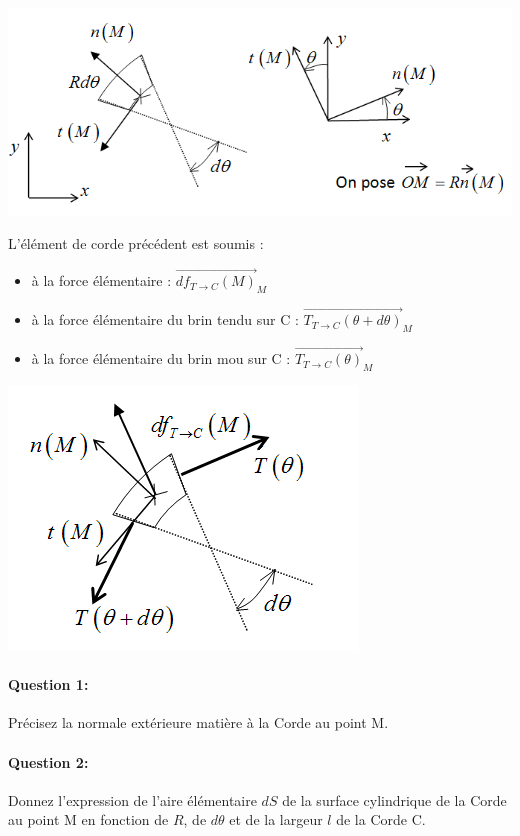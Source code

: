 \begin{center}
	\includegraphics[width=0.7\linewidth]{img/winch_param.png}
\end{center}

 \begin{minipage}{0.45\linewidth}
L'élément de corde précédent est soumis :
\begin{itemize}
 \item à la force élémentaire : $\overrightarrow{df_{T \rightarrow C}(M)}_M$  
 \item à la force élémentaire du brin tendu sur C :  $\overrightarrow{T_{T \rightarrow C}(\theta+d \theta)}_M$  
 \item à la force élémentaire du brin mou sur C : $\overrightarrow{T_{T \rightarrow C}(\theta)}_M$  
\end{itemize}
 \end{minipage}
 \hfill
  \begin{minipage}{0.53\linewidth}
  \centering\includegraphics[width=0.7\linewidth]{img/winch_param2.png}
  \end{minipage}


\paragraph{Question 1:} Précisez la normale extérieure matière à la Corde au point M. 

\paragraph{Question 2:} Donnez l'expression de l'aire élémentaire $dS$ de la surface cylindrique de la Corde au point M en fonction de $R$, de $d\theta$ et de la largeur $l$ de la Corde C.


